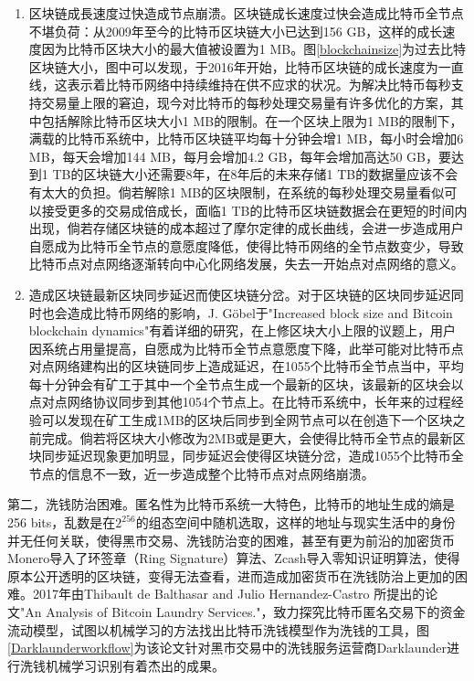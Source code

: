 					\begin{enumerate}
						\item 区块链成⾧速度过快造成节点崩溃。区块链成长速度过快会造成比特币全节点不堪负荷：从2009年至今的比特币区块链大小已达到156 GB，这样的成长速度因为比特币区块大小的最大值被设置为1 MB。图\ref{blockchainsize}为过去比特区块链大小，图中可以发现，于2016年开始，比特币区块链的成长速度为一直线，这表示着比特币网络中持续维持在供不应求的状况。为解决比特币每秒⽀持交易量上限的窘迫，现今对⽐特币的每秒处理交易量有许多优化的⽅案，其中包括解除比特币区块大小1 MB的限制。在一个区块上限为1 MB的限制下，满载的比特币系统中，比特币区块链平均每十分钟会增1 MB，每小时会增加6 MB，每天会增加144 MB，每月会增加4.2 GB，每年会增加高达50 GB，要达到1 TB的区块链大小还需要8年，在8年后的未来存储1 TB的数据量应该不会有太大的负担。倘若解除1 MB的区块限制，在系统的每秒处理交易量看似可以接受更多的交易成倍成长，面临1 TB的比特币区块链数据会在更短的时间内出现，倘若存储区块链的成本超过了摩尔定律的成长曲线，会进一步造成用户自愿成为比特币全节点的意愿度降低，使得比特币网络的全节点数变少，导致比特币点对点网络逐渐转向中心化网络发展，失去一开始点对点网络的意义。

						\item 造成区块链最新区块同步延迟而使区块链分岔。对于区块链的区块同步延迟同时也会造成比特币网络的影响，J. Göbel于"Increased block size and Bitcoin blockchain dynamics"\supercite{TelecommunicationNetworksandApplicationsConferenceITNAC201727thInternational}有着详细的研究，在上修区块大小上限的议题上，用户因系统占用量提高，⾃愿成为⽐特币全节点意愿度下降，此举可能对⽐特币点对点网络建构出的区块链同步上造成延迟，在1055个比特币全节点当中，平均每十分钟会有矿工于其中一个全节点生成一个最新的区块，该最新的区块会以点对点网络协议同步到其他1054个节点上。在比特币系统中，长年来的过程经验可以发现在矿工生成1MB的区块后同步到全网节点可以在创造下一个区块之前完成。倘若将区块大小修改为2MB或是更大，会使得比特币全节点的最新区块同步延迟现象更加明显，同步延迟会使得区块链分岔，造成1055个比特币全节点的信息不一致，近一步造成整个比特币点对点网络崩溃。
					\end{enumerate}
					

				第二，洗钱防治困难。匿名性为比特币系统一大特色，比特币的地址生成的熵是256 bits，乱数是在$2^{256}$的组态空间中随机选取，这样的地址与现实生活中的身份并无任何关联，使得黑市交易、洗钱防治变的困难，甚至有更为前沿的加密货币Monero\supercite{noether2014monero}导入了环签章（Ring Signature）\supercite{Thresholdringsignaturesandapplicationstoad-hocgroups}算法、Zcash\supercite{zhong2002faster}导入零知识证明算法\supercite{Zero-KnowledgeProofsofIdentity}，使得原本公开透明的区块链，变得无法查看，进而造成加密货币在洗钱防治上更加的困难。2017年由Thibault de Balthasar and Julio Hernandez-Castro 所提出的论文"An Analysis of Bitcoin Laundry Services."\supercite{AnAnalysisofBitcoinLaundryServices}，致⼒探究⽐特币匿名交易下的资⾦流动模型，试图以机械学习的方法找出比特币洗钱模型作为洗钱的工具，图\ref{Darklaunderworkflow}为该论文针对黑市交易中的洗钱服务运营商Darklaunder进行洗钱机械学习识别有着杰出的成果。

